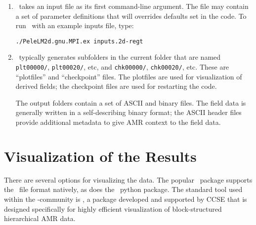 \begin{enumerate}

\item \pelelm\ takes an input file as its first command-line argument.  The file may
contain a set of parameter definitions that will overrides defaults set in the code.
  To run \pelelm\ with an example inputs file, type:
\begin{verbatim}
./PeleLM2d.gnu.MPI.ex inputs.2d-regt
\end{verbatim}

\item \pelelm\ typically generates subfolders in the current folder that
  are named {\tt plt00000/}, {\tt plt00020/}, etc, and {\tt chk00000/},
  {\tt chk00020/}, etc. These are ``plotfiles'' and ``checkpoint''
  files. The plotfiles are used for visualization of derived fields; the checkpoint
  files are used for restarting the code.

  The output folders contain a set of ASCII and binary files.  The field
  data is generally written in a self-describing binary format; the 
  ASCII header files provide additional metadata to give AMR context to the field data.

\end{enumerate}

\section{Visualization of the Results}

There are several options for visualizing the data.  The popular
\visit\ package supports the \amrex\ file format natively, as does
the \yt\ python package.  The standard tool used within the
\amrex-community is \amrvis, a package developed and supported 
by CCSE that is designed specifically for highly efficient visualization
of block-structured hierarchical AMR data.

